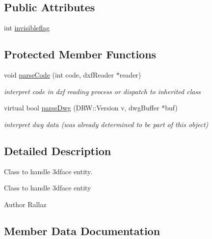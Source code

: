 \subsection*{Public Attributes}
\begin{DoxyCompactItemize}
\item 
int \hyperlink{class_d_r_w__3_dface_a0fbb465670025bbd116aef1804fa5b44}{invisibleflag}
\end{DoxyCompactItemize}
\subsection*{Protected Member Functions}
\begin{DoxyCompactItemize}
\item 
\hypertarget{class_d_r_w__3_dface_a841b20016d7bf6d3221aa690fb477076}{}void \hyperlink{class_d_r_w__3_dface_a841b20016d7bf6d3221aa690fb477076}{parse\+Code} (int code, dxf\+Reader $\ast$reader)\label{class_d_r_w__3_dface_a841b20016d7bf6d3221aa690fb477076}

\begin{DoxyCompactList}\small\item\em interpret code in dxf reading process or dispatch to inherited class \end{DoxyCompactList}\item 
\hypertarget{class_d_r_w__3_dface_a728d8ad4840139bb826a67f1012b22ed}{}virtual bool \hyperlink{class_d_r_w__3_dface_a728d8ad4840139bb826a67f1012b22ed}{parse\+Dwg} (D\+R\+W\+::\+Version v, dwg\+Buffer $\ast$buf)\label{class_d_r_w__3_dface_a728d8ad4840139bb826a67f1012b22ed}

\begin{DoxyCompactList}\small\item\em interpret dwg data (was already determined to be part of this object) \end{DoxyCompactList}\end{DoxyCompactItemize}


\subsection{Detailed Description}
Class to handle 3dface entity. 

Class to handle 3dface entity \begin{DoxyAuthor}{Author}
Rallaz 
\end{DoxyAuthor}


\subsection{Member Data Documentation}
\hypertarget{class_d_r_w__3_dface_a0fbb465670025bbd116aef1804fa5b44}{}
